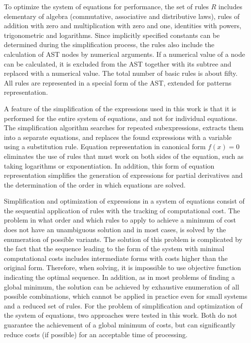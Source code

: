 \documentclass[lettersize,journal]{IEEEtran}
\begin{document}
To optimize the system of equations for performance, the set of rules \(R\) includes elementary of algebra (commutative, associative and distributive laws), 
rules of addition with zero and multiplication with zero and one, identities with powers, trigonometric and logarithms. 
Since implicitly specified constants can be determined during the simplification process, the rules also include the calculation of AST nodes by numerical
arguments. If a numerical value of a node can be calculated, it is excluded from the AST together with its subtree and replaced with a numerical value. 
The total number of basic rules is about fifty. All rules are represented in a special form of the AST, extended
for patterns representation.

A feature of the simplification of the expressions used in this work is that it is performed for the entire system of equations, and not for
individual equations. The simplification algorithm searches for repeated subexpressions, extracts them into a separate equations, and replaces the found
expressions with a variable using a substitution rule. Equation representation in canonical form \(f(x)=0\) eliminates the use of rules that must 
work on both sides of the equation, such as taking logarithms or exponentiation. In addition, this form of equation representation simplifies the
generation of expressions for partial derivatives and the determination of the order in which equations are solved.

Simplification and optimization of expressions in a system of equations consist of the sequential application of rules with the tracking of computational
cost. The problem in what order and which rules to apply to achieve a minimum of cost does not have an unambiguous solution and in most cases,
is solved by the enumeration of possible variants. The solution of this problem is complicated by the fact that the sequence leading to the form of 
the system with minimal computational costs includes intermediate forms with costs higher than the original form. Therefore, when solving, it 
is impossible to use objective function indicating the optimal sequence. In addition, as in most problems of finding a global minimum, 
the solution can be achieved by exhaustive enumeration of all possible combinations, which cannot be applied in practice even for small systems and a
reduced set of rules. For the problem of simplification and optimization of the system of equations, two approaches were tested in this work. 
Both do not guarantee the achievement of a global minimum of costs, but can significantly reduce costs (if possible) for an acceptable time of processing.
\end{document}

